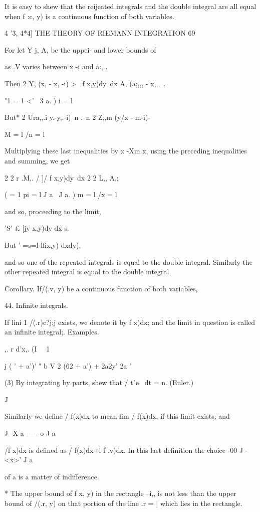 It is easy to shew that the reijeated integrals and the double
integral are all equal when f :c, y) is a continuous function of both
variables.



4 '3, 4*4] THE THEORY OF RIEMANN INTEGRATION 69

For let Y j, A, be the uppei- and lower bounds of

as .V varies between x -i and a:, .

Then 2 Y, (x, - x, -i) > \ f x,y)dy\ dx A, (a;,,, - x,,,\ .

"1 = 1 <' \ 3 a. ) i = l

But* 2 Ura,,.i y.-y,.-i) \,n .\ n 2 Z,,m (y/x - m-i)-

M = l /n = l

Multiplying these last inequalities by x -Xm x, using the preceding
inequalities and summing, we get

2 2 r .M,. / ]/ f x,y)dy\ dx 2 2 L,, A,;

 ( = 1 pi = l J a \ J a. ) m = l /x = l

and so, proceeding to the limit,

'S' £ [jy x,y)dy dx s.

But ' =s=l lfix,y) dxdy),

and so one of the repeated integrals is equal to the double integral.
Similarly the other repeated integral is equal to the double integral.

Corollary. If/(.v, y) be a continuous function of both variables,

44. Infinite integrals.

If lini 1 /(.r)c?j;j exists, we denote it by f x)dx; and the limit in
question is called an infinite integral;. Examples.

,. r d'x,. (I \ \ 1

  j ( ' + a')' " b V 2 (62 + a') + 2a2y' 2a '

(3) By integrating by parts, shew that / t"e~ dt = n. (Euler.)

J

Similarly we define / f(x)dx to mean lim / f(x)dx, if this limit
exists; and

J -X a- — -o J a

/f x)dx is defined as / f(x)dx+l f .v)dx. In this last definition the
choice -00 J -<x>' J a

of a is a matter of indifference.

* The upper bound of f x, y) in the rectangle --i,, is not less than
the upper bound of /(.r, y) on that portion of the line .r = | which
lies in the rectangle.

